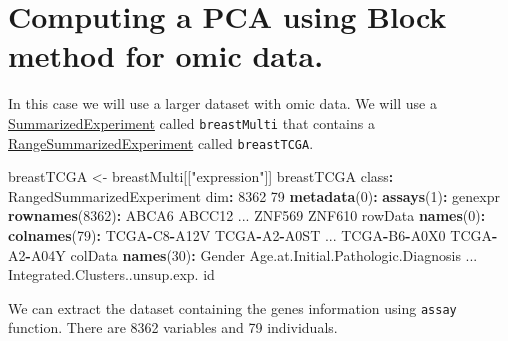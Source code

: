 \documentclass[]{article}
\newenvironment{Shaded}{\begin{snugshade}}{\end{snugshade}}
\newcommand{\KeywordTok}[1]{\textcolor[rgb]{0.13,0.29,0.53}{\textbf{#1}}}
\newcommand{\DecValTok}[1]{\textcolor[rgb]{0.00,0.00,0.81}{#1}}
\newcommand{\StringTok}[1]{\textcolor[rgb]{0.31,0.60,0.02}{#1}}
\newcommand{\OperatorTok}[1]{\textcolor[rgb]{0.81,0.36,0.00}{\textbf{#1}}}
\newcommand{\NormalTok}[1]{#1}
\begin{document}
\section{Computing a PCA using Block method for omic
data.}\label{computing-a-pca-using-block-method-for-omic-data.}

In this case we will use a larger dataset with omic data. We will use a
\href{https://www.rdocumentation.org/packages/SummarizedExperiment}{SummarizedExperiment}
called \texttt{breastMulti} that contains a
\href{https://www.rdocumentation.org/packages/SummarizedExperiment/versions/1.2.3/topics/RangedSummarizedExperiment-class}{RangeSummarizedExperiment}
called \texttt{breastTCGA}.

\begin{Shaded}
\begin{Highlighting}[]
\NormalTok{breastTCGA <-}\StringTok{ }\NormalTok{breastMulti[[}\StringTok{"expression"}\NormalTok{]]}
\NormalTok{breastTCGA}
\NormalTok{class}\OperatorTok{:}\StringTok{ }\NormalTok{RangedSummarizedExperiment }
\NormalTok{dim}\OperatorTok{:}\StringTok{ }\DecValTok{8362} \DecValTok{79} 
\KeywordTok{metadata}\NormalTok{(}\DecValTok{0}\NormalTok{)}\OperatorTok{:}
\KeywordTok{assays}\NormalTok{(}\DecValTok{1}\NormalTok{)}\OperatorTok{:}\StringTok{ }\NormalTok{genexpr}
\KeywordTok{rownames}\NormalTok{(}\DecValTok{8362}\NormalTok{)}\OperatorTok{:}\StringTok{ }\NormalTok{ABCA6 ABCC12 ... ZNF569 ZNF610}
\NormalTok{rowData }\KeywordTok{names}\NormalTok{(}\DecValTok{0}\NormalTok{)}\OperatorTok{:}
\KeywordTok{colnames}\NormalTok{(}\DecValTok{79}\NormalTok{)}\OperatorTok{:}\StringTok{ }\NormalTok{TCGA}\OperatorTok{-}\NormalTok{C8}\OperatorTok{-}\NormalTok{A12V TCGA}\OperatorTok{-}\NormalTok{A2}\OperatorTok{-}\NormalTok{A0ST ... TCGA}\OperatorTok{-}\NormalTok{B6}\OperatorTok{-}\NormalTok{A0X0}
\NormalTok{  TCGA}\OperatorTok{-}\NormalTok{A2}\OperatorTok{-}\NormalTok{A04Y}
\NormalTok{colData }\KeywordTok{names}\NormalTok{(}\DecValTok{30}\NormalTok{)}\OperatorTok{:}\StringTok{ }\NormalTok{Gender Age.at.Initial.Pathologic.Diagnosis ...}
\NormalTok{  Integrated.Clusters..unsup.exp. id}
\end{Highlighting}
\end{Shaded}

We can extract the dataset containing the genes information using
\texttt{assay} function. There are 8362 variables and 79 individuals.
\end{document}
